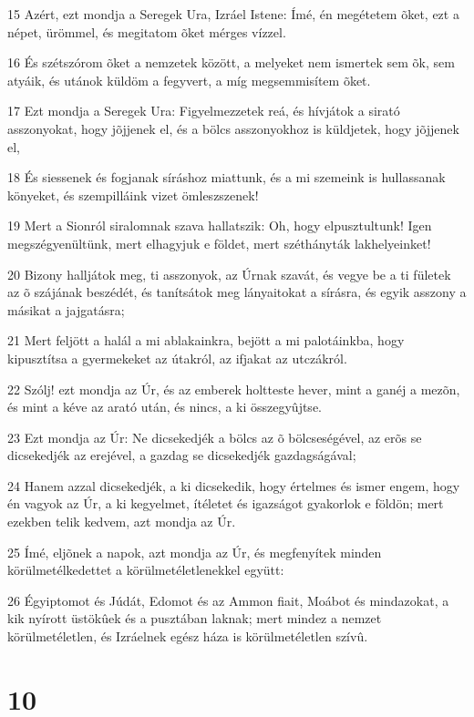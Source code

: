 \par 15 Azért, ezt mondja a Seregek Ura, Izráel Istene: Ímé, én megétetem õket, ezt a népet, ürömmel, és megitatom õket mérges vízzel.
\par 16 És szétszórom õket a nemzetek között, a melyeket nem ismertek sem õk, sem atyáik, és utánok küldöm a fegyvert, a míg megsemmisítem õket.
\par 17 Ezt mondja a Seregek Ura: Figyelmezzetek reá, és hívjátok a sirató asszonyokat, hogy jõjjenek el, és a bölcs asszonyokhoz is küldjetek, hogy jõjjenek el,
\par 18 És siessenek és fogjanak síráshoz miattunk, és a mi szemeink is hullassanak könyeket, és szempilláink vizet ömleszszenek!
\par 19 Mert a Sionról siralomnak szava hallatszik: Oh, hogy elpusztultunk! Igen megszégyenültünk, mert elhagyjuk e földet, mert széthányták lakhelyeinket!
\par 20 Bizony halljátok meg, ti asszonyok, az Úrnak szavát, és vegye be a ti fületek az õ szájának beszédét, és tanítsátok meg lányaitokat a sírásra, és egyik asszony a másikat a jajgatásra;
\par 21 Mert feljött a halál a mi ablakainkra, bejött a mi palotáinkba, hogy kipusztítsa a gyermekeket az útakról, az ifjakat az utczákról.
\par 22 Szólj! ezt mondja az Úr, és az emberek holtteste hever, mint a ganéj a mezõn, és mint a kéve az arató után, és nincs, a ki összegyûjtse.
\par 23 Ezt mondja az Úr: Ne dicsekedjék a bölcs az õ bölcseségével, az erõs se dicsekedjék az erejével, a gazdag se dicsekedjék  gazdagságával;
\par 24 Hanem azzal dicsekedjék, a ki dicsekedik, hogy értelmes és ismer engem, hogy én vagyok az Úr, a ki kegyelmet, ítéletet és igazságot gyakorlok e földön; mert ezekben telik kedvem, azt mondja az Úr.
\par 25 Ímé, eljõnek a napok, azt mondja az Úr, és megfenyítek minden körülmetélkedettet a körülmetéletlenekkel együtt:
\par 26 Égyiptomot és Júdát, Edomot és az Ammon fiait, Moábot és mindazokat, a kik nyírott üstökûek és a pusztában laknak; mert mindez a nemzet körülmetéletlen, és Izráelnek egész háza is körülmetéletlen  szívû.

\chapter{10}

